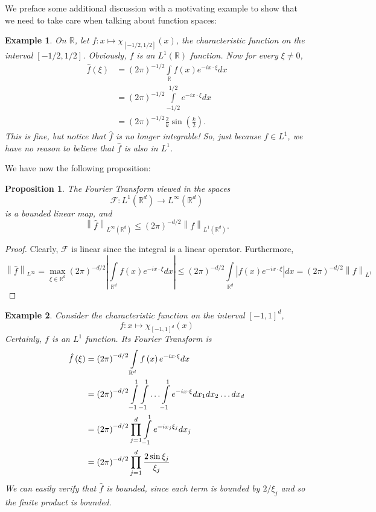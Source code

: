 \documentclass[letterpaper,twoside,12pt]{article}
\theoremstyle{mystyle}
\newtheorem{prop}{Proposition}[section]
\newtheorem*{example}{Example}
\newcommand{\R}{{\mathbb R}}
\begin{document}
We preface some additional discussion with a motivating example to show that we need to take care when talking about function spaces:
\begin{example}
  On $\R$, let $f : x \mapsto \chi_{[-1/2, 1/2]}(x)$, the characteristic function on the interval $[-1/2, 1/2]$. Obviously, $f$ is an $L^1\left( \R \right)$ function. Now for every $\xi\neq 0$, 
  \begin{align*}
    \hat f (\xi) &= \left( 2\pi \right)^{-1/2} \int\limits_\R f(x) e^{-ix\cdot \xi} dx \\
    &= \left( 2\pi \right)^{-1/2} \int\limits_{-1/2}^{1/2} e^{-ix\cdot \xi} dx \\
    &=\left( 2\pi \right)^{-1/2} \frac{2}{k}\sin\left( \frac{k}{2} \right).
  \end{align*}
  This is fine, but notice that $\hat f$ is no longer integrable! So, just because $f \in L^1$, we have no reason to believe that $\hat f$ is also in $L^1$. 
\end{example}
We have now the following proposition: 
\begin{prop}
  The Fourier Transform viewed in the spaces
  \[\mathcal F : L^1\left( \R^d \right) \to L^\infty \left( \R^d \right)\]
  is a bounded linear map, and 
  \[\left\| \hat f \right\|_{L^\infty \left( \R^d \right)} \leq \left( 2\pi \right)^{-d/2} \left\| f \right\|_{L^1\left( \R^d \right)}. \]
\end{prop}
\begin{proof}
  Clearly, $\mathcal F$ is linear since the integral is a linear operator. Furthermore, 
  \[{\left\| {\hat f} \right\|_{{L^\infty }}} = \mathop {\max }\limits_{\xi  \in {\mathbb{R}^d}} {\left( {2\pi } \right)^{ - d/2}}\left| {\int\limits_{{\mathbb{R}^d}} {f\left( x \right){e^{ - ix \cdot \xi }}dx} } \right| \leqslant {\left( {2\pi } \right)^{ - d/2}}\int\limits_{{\mathbb{R}^d}} {\left| {f\left( x \right){e^{ - ix \cdot \xi }}} \right|dx}  = {\left( {2\pi } \right)^{ - d/2}}{\left\| f \right\|_{{L^1}}}\]
\end{proof}
\begin{example}
  Consider the characteristic function on the interval $[-1, 1]^d$, 
  \[f:x \mapsto {\chi _{{{\left[ { - 1,1} \right]}^d}}}\left( x \right)\]
  Certainly, $f$ is an $L^1$ function. Its Fourier Transform is 
  \begin{align*}
    \hat f\left( \xi  \right) &= {\left( {2\pi } \right)^{ - d/2}}\int\limits_{{\mathbb{R}^d}} {f\left( x \right){e^{ - ix \cdot \xi }}dx}  \hfill \\
     &= {\left( {2\pi } \right)^{ - d/2}}\int\limits_{ - 1}^1 {\int\limits_{ - 1}^1 { \ldots \int\limits_{ - 1}^1 {{e^{ - ix \cdot \xi }}d{x_1}d{x_2} \ldots d{x_d}} } }  \hfill \\
     &= {\left( {2\pi } \right)^{ - d/2}}\prod\limits_{j = 1}^d {\int\limits_{ - 1}^1 {{e^{ - i{x_j}{\xi _j}}}d{x_j}} }  \hfill \\
     &= {\left( {2\pi } \right)^{ - d/2}}\prod\limits_{j = 1}^d {\frac{{2\sin {\xi _j}}}{{{\xi _j}}}} 
  \end{align*}
  We can easily verify that $\hat f$ is bounded, since each term is bounded by $2/\xi_j$ and so the finite product is bounded. 
\end{example}
\end{document}

